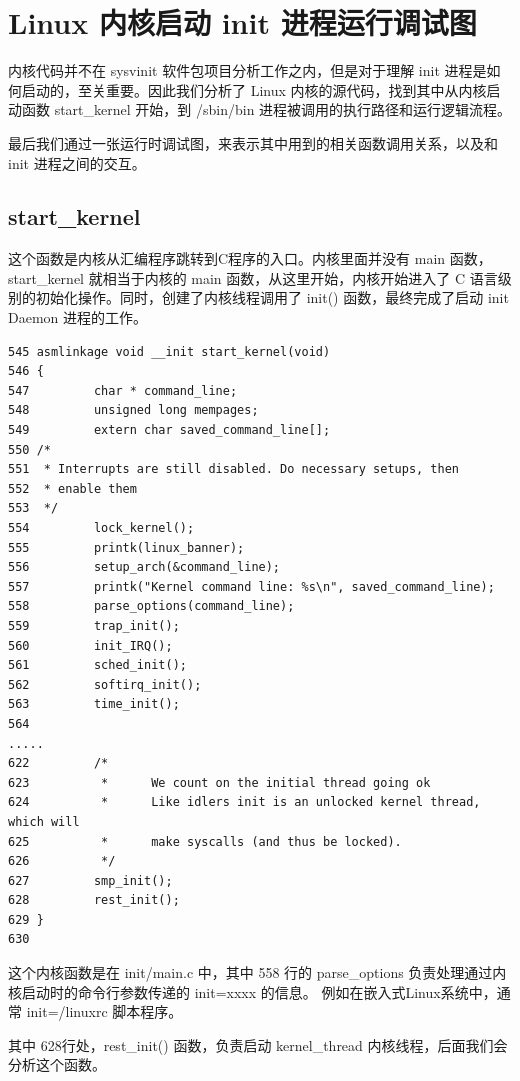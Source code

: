 \section{Linux 内核启动 init 进程运行调试图}

内核代码并不在 sysvinit 软件包项目分析工作之内，但是对于理解 init
进程是如何启动的，至关重要。因此我们分析了 Linux
内核的源代码，找到其中从内核启动函数 start\_kernel 开始，到 /sbin/bin
进程被调用的执行路径和运行逻辑流程。

最后我们通过一张运行时调试图，来表示其中用到的相关函数调用关系，以及和
init 进程之间的交互。

\subsection{start\_kernel}

这个函数是内核从汇编程序跳转到C程序的入口。内核里面并没有 main
函数，start\_kernel 就相当于内核的 main 函数，从这里开始，内核开始进入了 C
语言级别的初始化操作。同时，创建了内核线程调用了 init()
函数，最终完成了启动 init Daemon 进程的工作。

{\begin{shaded}\begin{verbatim}
545 asmlinkage void __init start_kernel(void)
546 {
547         char * command_line;
548         unsigned long mempages;
549         extern char saved_command_line[];
550 /*
551  * Interrupts are still disabled. Do necessary setups, then
552  * enable them
553  */
554         lock_kernel();
555         printk(linux_banner);
556         setup_arch(&command_line);
557         printk("Kernel command line: %s\n", saved_command_line);
558         parse_options(command_line);
559         trap_init();
560         init_IRQ();
561         sched_init();
562         softirq_init();
563         time_init();
564 
.....
622         /* 
623          *      We count on the initial thread going ok 
624          *      Like idlers init is an unlocked kernel thread, which will
625          *      make syscalls (and thus be locked).
626          */
627         smp_init();
628         rest_init();
629 }
630 
\end{verbatim}\end{shaded}}
这个内核函数是在 init/main.c 中，其中 558 行的 parse\_options
负责处理通过内核启动时的命令行参数传递的 init=xxxx 的信息。
例如在嵌入式Linux系统中，通常 init=/linuxrc 脚本程序。

其中 628行处，rest\_init() 函数，负责启动 kernel\_thread
内核线程，后面我们会分析这个函数。

